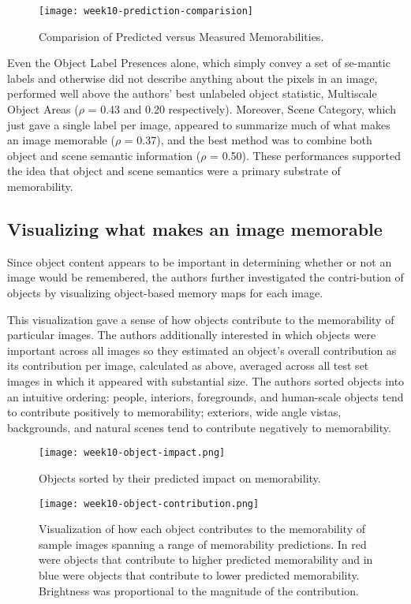 \newpage
\begin{figure}[!ht]
\centering
\texttt{[image: week10-prediction-comparision]}
\caption{Comparision of Predicted versus Measured Memorabilities.}
\end{figure}

Even the Object Label Presences alone, which simply convey a set of se-mantic labels and otherwise did not describe anything about the pixels in an image, performed well above the authors' best unlabeled object statistic, Multiscale Object Areas ($\rho$ = 0.43 and 0.20 respectively). Moreover, Scene Category, which just gave a single label per image, appeared to summarize much of what makes an image memorable ($\rho$ = 0.37), and the best method was to combine both object and scene semantic information ($\rho$ = 0.50). These performances supported the idea that object and scene semantics were a primary substrate of memorability.

\subsection{Visualizing what makes an image memorable}
Since object content appears to be important in determining whether or not an image would be remembered, the authors further investigated the contri-bution of objects by visualizing object-based memory maps for each image.

This visualization gave a sense of how objects contribute
to the memorability of particular images. The authors additionally interested in which objects were important across all images so they estimated an object’s overall contribution as its contribution per image, calculated as above, averaged across all test set images in which it appeared with substantial size. The authors sorted objects into an intuitive ordering: people, interiors, foregrounds, and human-scale objects tend to contribute positively to memorability; exteriors, wide angle vistas, backgrounds, and natural scenes tend to contribute negatively to memorability.

\begin{figure}[!ht]
\centering
\texttt{[image: week10-object-impact.png]}
\caption{Objects sorted by their predicted impact on memorability.}
\end{figure}

\newpage
\begin{figure}[!ht]
\centering
\texttt{[image: week10-object-contribution.png]}
\caption{Visualization of how each object contributes to the memorability of sample images spanning a range of memorability predictions. In red were objects that contribute to higher predicted memorability and in blue were objects that contribute to lower predicted memorability. Brightness was proportional to the magnitude of the contribution.}
\end{figure}


